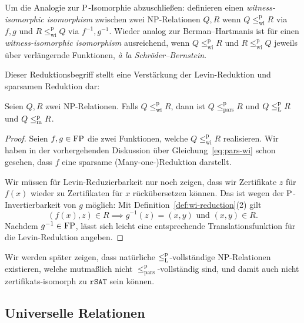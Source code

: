 Um die Analogie zur $\P$-Isomorphie abzuschließen: \citeauthor{wiedermann_witness-isomorphic_1995} definieren einen \emph{witness-isomorphic isomorphism} zwischen zwei NP-Relationen $Q, R$ wenn $Q\leq_\mathrm{wi}^\mathrm p R$ via $f,g$ und $R\leq_\mathrm{wi}^\mathrm p Q$ via $f^{-1}, g^{-1}$. Wieder analog zur Berman–Hartmanis ist für einen \emph{witness-isomorphic isomorphism} ausreichend, wenn $Q\leq_\mathrm{wi}^\mathrm p R$ und $R\leq_\mathrm{wi}^\mathrm p Q$ jeweils über verlängernde Funktionen, \emph{à la Schröder–Bernstein}.

Dieser Reduktionsbegriff stellt eine Verstärkung der Levin-Reduktion und sparsamen Reduktion dar:
\begin{lemma}\label{lemma:wi-reduction}
    Seien $Q, R$ zwei NP-Relationen. Falls $Q\leq_\mathrm{wi}^\mathrm p R$, dann ist $Q\leq_\mathrm{pars}^\mathrm p R$ und $Q\leqlp R$ und $Q\leqmp R$.
\end{lemma}
\begin{proof}
    Seien $f,g\in \FP$ die zwei Funktionen, welche $Q\leq_\mathrm{wi}^\mathrm p R$ realisieren.
    Wir haben in der vorhergehenden Diskussion über Gleichung~\ref{eq:pars-wi} schon gesehen, dass $f$ eine sparsame (Many-one-)Reduktion darstellt.

    Wir müssen für Levin-Reduzierbarkeit nur noch zeigen, dass wir Zertifikate $z$ für $f(x)$ wieder zu Zertifikaten für $x$ rückübersetzen können. Das ist wegen der $\P$-Invertierbarkeit von $g$ möglich:
    Mit Definition~\ref{def:wi-reduction}(2) gilt
    \[ (f(x), z) \in R \implies g^{-1}(z)=(x,y) \text{ und } (x,y)\in R. \]
    Nachdem $g^{-1}\in\FP$, lässt sich leicht eine entsprechende Translationsfunktion für die Levin-Reduktion angeben.
\end{proof}

Wir werden später zeigen, dass natürliche $\leqlp$-vollständige NP-Relationen existieren, welche  mutmaßlich nicht $\leq_\mathrm{pars}^\mathrm p$-vollständig sind, und damit auch nicht zertifikats-isomorph zu $\mathtt{rSAT}$ sein können.

\subsection*{Universelle Relationen}

